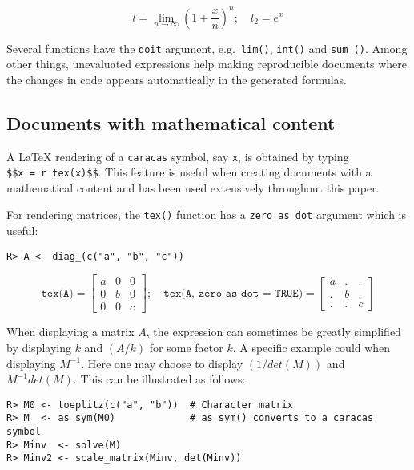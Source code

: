 \begin{equation}
l = \lim_{n \to \infty} \left(1 + \frac{x}{n}\right)^{n}; \quad l_2 = e^{x}
\end{equation}

Several functions have the \texttt{doit} argument, e.g.~\texttt{lim()}, \texttt{int()} and \texttt{sum\_()}.
Among other things, unevaluated expressions help making reproducible documents where the changes
in code appears automatically in the generated formulas.

\hypertarget{documents-with-mathematical-content}{%
\subsection{Documents with mathematical content}\label{documents-with-mathematical-content}}

A LaTeX rendering of a \texttt{caracas} symbol, say \texttt{x}, is obtained by typing
\texttt{\$\$x\ =\ \textasciigrave{}r\ tex(x)\textasciigrave{}\$\$}. This feature is useful
when creating documents with a mathematical content and has been used
extensively throughout this paper.

For rendering matrices, the \texttt{tex()} function
has a \texttt{zero\_as\_dot} argument which is useful:

\begin{verbatim}
R> A <- diag_(c("a", "b", "c"))
\end{verbatim}

\begin{equation}
\texttt{tex(A)} = \left[\begin{matrix}a & 0 & 0\\0 & b & 0\\0 & 0 & c\end{matrix}\right]; \quad \texttt{tex(A, zero\_as\_dot = TRUE)} = \left[\begin{matrix}a & . & .\\. & b & .\\. & . & c\end{matrix}\right]
\end{equation}

When displaying a matrix \(A\), the expression can sometimes be greatly
simplified by displaying \(k\) and \((A/k)\) for some factor \(k\). A specific
example could when displaying \(M^{-1}\). Here one may choose to display
\((1/det(M))\) and \(M^{-1} det(M)\). This can be illustrated as follows:

\begin{verbatim}
R> M0 <- toeplitz(c("a", "b"))  # Character matrix
R> M  <- as_sym(M0)             # as_sym() converts to a caracas symbol
R> Minv  <- solve(M)
R> Minv2 <- scale_matrix(Minv, det(Minv))
\end{verbatim}

